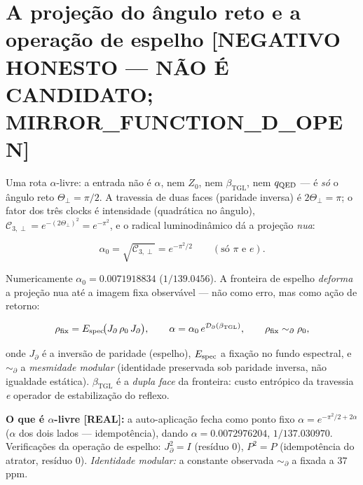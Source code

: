 \documentclass[11pt]{article}
\newcommand{\bTGL}{\beta_{\mathrm{TGL}}}\newcommand{\Msun}{M_{\odot}}\newcommand{\TGL}{\mathrm{TGL}}
\theoremstyle{definition}\newtheorem{deriv}{Derivação}
\begin{document}
\section{A projeção do ângulo reto e a operação de espelho \textsf{[NEGATIVO HONESTO --- NÃO É CANDIDATO; MIRROR\_FUNCTION\_D\_OPEN]}}

Uma rota $\alpha$-livre: a entrada não é $\alpha$, nem $Z_0$, nem $\bTGL$, nem $q_{\rm QED}$ --- é \emph{só} o ângulo reto $\Theta_\perp=\pi/2$. A travessia de duas faces (paridade inversa) é $2\Theta_\perp=\pi$; o fator dos três clocks é intensidade (quadrática no ângulo), $\mathcal C_{3,\perp}=e^{-(2\Theta_\perp)^2}=e^{-\pi^2}$, e o radical luminodinâmico dá a projeção \emph{nua}:

\begin{equation} \alpha_0=\sqrt{\mathcal C_{3,\perp}}=e^{-\pi^2/2}\qquad(\text{só }\pi\text{ e }e).\end{equation}

Numericamente $\alpha_0=0.0071918834$ ($1/139.0456$). A fronteira de espelho \emph{deforma} a projeção nua até a imagem fixa observável --- não como erro, mas como ação de retorno:

\begin{equation} \rho_{\rm fix}=E_{\rm spec}\!\big(J_\partial\,\rho_0\,J_\partial\big),\qquad \alpha=\alpha_0\,e^{\mathcal D_\partial(\bTGL)},\qquad \rho_{\rm fix}\sim_\partial\rho_0,\end{equation}

onde $J_\partial$ é a inversão de paridade (espelho), $E_{\rm spec}$ a fixação no fundo espectral, e $\sim_\partial$ a \emph{mesmidade modular} (identidade preservada sob paridade inversa, não igualdade estática). $\bTGL$ é a \emph{dupla face} da fronteira: custo entrópico da travessia \emph{e} operador de estabilização do reflexo.

\textbf{O que é $\alpha$-livre \textsf{[REAL]}:} a auto-aplicação fecha como ponto fixo $\alpha=e^{-\pi^2/2+2\alpha}$ ($\alpha$ dos dois lados --- idempotência), dando $\alpha=0.0072976204$, $1/137.030970$. Verificações da operação de espelho: $J_\partial^2=I$ (resíduo $0$), $P^2=P$ (idempotência do atrator, resíduo $0$). \emph{Identidade modular:} a constante observada $\sim_\partial$ a fixada a $37$ ppm.
\end{document}
